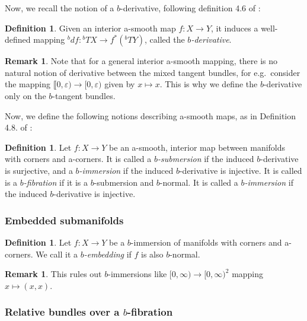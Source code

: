 \documentclass[10pt, a4paper]{article}
\theoremstyle{plain}%
\theoremstyle{definition}
\newtheorem{defn}[theorem]{Definition}
\newtheorem{rem}[theorem]{Remark}
\numberwithin{figure}{section}
\numberwithin{equation}{section}
\newcommand{\rt}{\rightarrow}
\newcommand{\ep}{\varepsilon}
\begin{document}
Now, we recall the notion of a $b$-derivative, following definition 4.6 of \cite{Joy16}:
\begin{defn}
	Given an interior a-smooth map $f:X\rt Y$, it induces a well-defined mapping $^bdf: {^bTX}\rt {f^*(^bTY)}$, called the \textit{$b$-derivative}.
\end{defn}
\begin{rem}
	Note that for a general interior a-smooth mapping, there is no natural notion of derivative between the mixed tangent bundles, for e.g.\ consider the mapping $\llbracket 0,\ep)\rt [0,\ep)$ given by $x\mapsto x$. This is why we define the $b$-derivative only on the $b$-tangent bundles.
\end{rem}

Now, we define the following notions describing a-smooth maps, as in Definition 4.8$.$ of \cite{Joy16}:
\begin{defn}
	Let $f:X\rightarrow Y$ be an a-smooth, interior map between manifolds with corners and a-corners. It is called a \textit{$b$-submersion} if the induced $b$-derivative is surjective, and a \textit{$b$-immersion} if the induced $b$-derivative is injective. It is called is a \textit{$b$-fibration} if it is a $b$-submersion and $b$-normal. It is called a \textit{$b$-immersion} if the induced $b$-derivative is injective.
\end{defn}


\subsubsection{Embedded submanifolds}

\begin{defn}
	Let $f:X\rt Y$ be a $b$-immersion of manifolds with corners and a-corners. We call it a \textit{$b$-embedding} if $f$ is also $b$-normal.
\end{defn}
 \begin{rem}
 	This rules out $b$-immersions like $[0,\infty)\rt [0,\infty)^2$ mapping $x\mapsto (x,x)$.
 \end{rem} 
 
\subsubsection{Relative bundles over a $b$-fibration}
\end{document}
